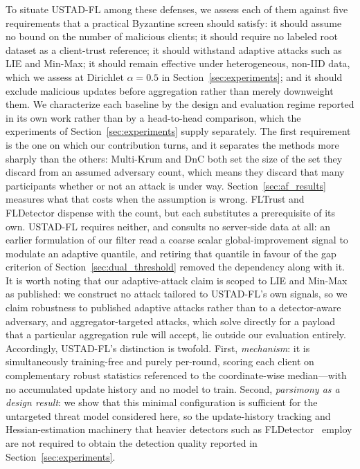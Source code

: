 \documentclass[journal]{IEEEtran}
\begin{document}
To situate USTAD-FL among these defenses, we assess each of them against five requirements that a practical Byzantine screen should satisfy: it should assume no bound on the number of malicious clients; it should require no labeled root dataset as a client-trust reference; it should withstand adaptive attacks such as LIE and Min-Max; it should remain effective under heterogeneous, non-IID data, which we assess at Dirichlet $\alpha=0.5$ in Section~\ref{sec:experiments}; and it should exclude malicious updates before aggregation rather than merely downweight them. We characterize each baseline by the design and evaluation regime reported in its own work rather than by a head-to-head comparison, which the experiments of Section~\ref{sec:experiments} supply separately. The first requirement is the one on which our contribution turns, and it separates the methods more sharply than the others: Multi-Krum and DnC both set the size of the set they discard from an assumed adversary count, which means they discard that many participants whether or not an attack is under way. Section~\ref{sec:af_results} measures what that costs when the assumption is wrong. FLTrust and FLDetector dispense with the count, but each substitutes a prerequisite of its own. USTAD-FL requires neither, and consults no server-side data at all: an earlier formulation of our filter read a coarse scalar global-improvement signal to modulate an adaptive quantile, and retiring that quantile in favour of the gap criterion of Section~\ref{sec:dual_threshold} removed the dependency along with it. It is worth noting that our adaptive-attack claim is scoped to LIE and Min-Max as published: we construct no attack tailored to USTAD-FL's own signals, so we claim robustness to published adaptive attacks rather than to a detector-aware adversary, and aggregator-targeted attacks, which solve directly for a payload that a particular aggregation rule will accept, lie outside our evaluation entirely. Accordingly, USTAD-FL's distinction is twofold. First, \emph{mechanism}: it is simultaneously training-free and purely per-round, scoring each client on complementary robust statistics referenced to the coordinate-wise median---with no accumulated update history and no model to train. Second, \emph{parsimony as a design result}: we show that this minimal configuration is sufficient for the untargeted threat model considered here, so the update-history tracking and Hessian-estimation machinery that heavier detectors such as FLDetector~\cite{zhang2022fldetector} employ are not required to obtain the detection quality reported in Section~\ref{sec:experiments}.
\end{document}
